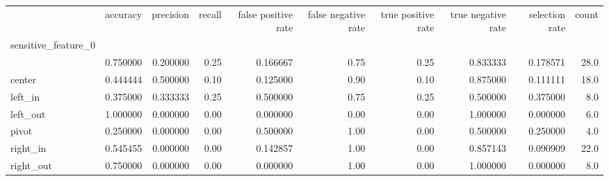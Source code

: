 \begin{tabular}{lrrrrrrrrr}
\toprule
{} &  accuracy &  precision &  recall &  false positive rate &  false negative rate &  true positive rate &  true negative rate &  selection rate &  count \\
sensitive\_feature\_0 &           &            &         &                      &                      &                     &                     &                 &        \\
\midrule
                    &  0.750000 &   0.200000 &    0.25 &             0.166667 &                 0.75 &                0.25 &            0.833333 &        0.178571 &   28.0 \\
center              &  0.444444 &   0.500000 &    0.10 &             0.125000 &                 0.90 &                0.10 &            0.875000 &        0.111111 &   18.0 \\
left\_in             &  0.375000 &   0.333333 &    0.25 &             0.500000 &                 0.75 &                0.25 &            0.500000 &        0.375000 &    8.0 \\
left\_out            &  1.000000 &   0.000000 &    0.00 &             0.000000 &                 0.00 &                0.00 &            1.000000 &        0.000000 &    6.0 \\
pivot               &  0.250000 &   0.000000 &    0.00 &             0.500000 &                 1.00 &                0.00 &            0.500000 &        0.250000 &    4.0 \\
right\_in            &  0.545455 &   0.000000 &    0.00 &             0.142857 &                 1.00 &                0.00 &            0.857143 &        0.090909 &   22.0 \\
right\_out           &  0.750000 &   0.000000 &    0.00 &             0.000000 &                 1.00 &                0.00 &            1.000000 &        0.000000 &    8.0 \\
\bottomrule
\end{tabular}
